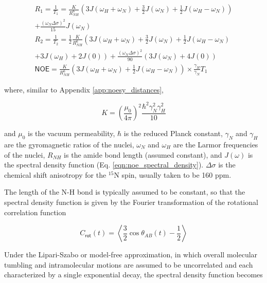 \documentclass[9pt,review]{livecoms}
\begin{document}
\begin{equation}
\label{eqn:redfield}
\begin{gathered}
R_1 = \frac {1} {T_1} = \frac {K} {R_{NH}^6} \left( 3 J(\omega_H + \omega_N) + \frac {3} {2} J(\omega_N) + \frac {1} {2} J(\omega_H - \omega_N) \right) \\
+ \frac {\left( \omega_N \Delta \sigma \right)^2} {15} J(\omega_N) \\
R_2 = \frac {1} {T_2} = \frac {1} {2} \frac {K} {R_{NH}^6} \left( 3 J(\omega_H + \omega_N) + \frac {3} {2} J(\omega_N) + \frac {1} {2} J(\omega_H - \omega_N) \right. \\
\left. + 3 J(\omega_H) + 2 J(0) \right) + \frac {\left( \omega_N \Delta \sigma \right)^2} {90} \left( 3 J(\omega_N) + 4 J(0) \right) \\
\mathsf{NOE} = \frac {K} {R_{NH}^6} \left( 3 J(\omega_H + \omega_N) + \frac {1} {2} J(\omega_H - \omega_N) \right) \times \frac {\gamma_H} {\gamma_N} T_1
\end{gathered}
\end{equation}

\noindent where, similar to Appendix \ref{app:noesy_distances},

\begin{equation}
\label{eqn:spin_relaxation_constant}
K = \left( \frac {\mu_0} {4 \pi} \right)^2 \frac {\hbar^2 \gamma_N^2 \gamma_H^2} {10}
\end{equation}

\noindent and $\mu_0$ is the vacuum permeability, $\hbar$ is the reduced Planck constant, $\gamma_N$ and $\gamma_H$ are the gyromagnetic ratios of the nuclei, $\omega_N$ and $\omega_H$ are the Larmor frequencies of the nuclei, $R_{NH}$ is the amide bond length (assumed constant), and $J(\omega)$ is the spectral density function (Eq. \ref{eqn:noe_spectral_density}).
$\Delta \sigma$ is the chemical shift anisotropy for the $^{15}$N spin, usually taken to be 160 ppm.

The length of the N-H bond is typically assumed to be constant, so that the spectral density function is given by the Fourier transformation of the rotational correlation function

\begin{equation}
\label{eqn:spin_relaxation_correlation_function}
C_{\mathsf{rot}}(t) = \left \langle \frac {3} {2} \cos \theta_{AB}(t) - \frac {1} {2} \right \rangle
\end{equation}

Under the Lipari-Szabo or model-free approximation, in which overall molecular tumbling and intramolecular motions are assumed to be uncorrelated and each characterized by a single exponential decay, the spectral density function becomes
\end{document}
